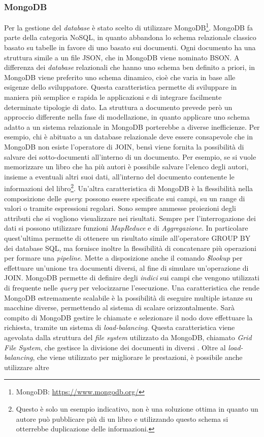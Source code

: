 \subsubsection{MongoDB}

Per la gestione del \emph{database} è stato scelto di utilizzare MongoDB\footnote{MongoDB: \url{https://www.mongodb.org/}}. MongoDB fa parte della categoria NoSQL, in quanto abbandona lo schema relazionale classico basato su tabelle in favore di uno basato sui documenti. Ogni documento ha una struttura simile a un file JSON, che in MongoDB viene nominato BSON. A differenza dei \emph{database} relazionali che hanno uno schema ben definito a priori, in MongoDB viene preferito uno schema dinamico, cioè che varia in base alle esigenze dello sviluppatore. Questa caratteristica permette di sviluppare in maniera più semplice e rapida le applicazioni e di integrare facilmente determinate tipologie di dato. La struttura a documento prevede però un approccio differente nella fase di modellazione, in quanto applicare uno schema adatto a un sistema relazionale in MongoDB porterebbe a diverse inefficienze. Per esempio, chi è abituato a un database relazionale deve essere consapevole che in MongoDB non esiste l'operatore di JOIN, bensì viene fornita la possibilità di salvare dei sotto-documenti all'interno di un documento. Per esempio, se si vuole memorizzare un libro che ha più autori è possibile salvare l'elenco degli autori, insieme a eventuali altri suoi dati, all'interno del documento contenente le informazioni del libro\footnote{Questo è solo un esempio indicativo, non è una soluzione ottima in quanto un autore può pubblicare più di un libro e utilizzando questo schema si otterrebbe duplicazione delle informazioni.}. Un'altra caratteristica di MongoDB è la flessibilità nella composizione delle \emph{query}: possono essere specificate sui campi, su un range di valori o tramite espressioni regolari. Sono sempre ammesse proiezioni degli attributi che si vogliono visualizzare nei risultati. Sempre per l'interrogazione dei dati si possono utilizzare funzioni \emph{MapReduce} e di \emph{Aggregazione}. In particolare quest'ultima permette di ottenere un risultato simile all'operatore GROUP BY dei database SQL, ma fornisce inoltre la flessibilità di concatenare più operazioni per formare una \emph{pipeline}. Mette a disposizione anche il comando \emph{\$lookup} per effettuare un'unione tra documenti diversi, al fine di simulare un'operazione di JOIN. MongoDB permette di definire degli \emph{indici} sui campi che vengono utilizzati di frequente nelle \emph{query} per velocizzarne l'esecuzione. Una caratteristica che rende MongoDB estremamente scalabile è la possibilità di eseguire multiple istanze su macchine diverse, permettendo al sistema di scalare orizzontalmente. Sarà compito di MongoDB gestire le chiamate e selezionare il nodo dove effettuare la richiesta, tramite un sistema di \emph{load-balancing}. Questa caratteristica viene agevolata dalla struttura del \emph{file system} utilizzato da MongoDB, chiamato \emph{Grid File System}, che gestisce la divisione dei documenti in diversi . Oltre al \emph{load-balancing}, che viene utilizzato per migliorare le prestazioni, è possibile anche utilizzare altre 